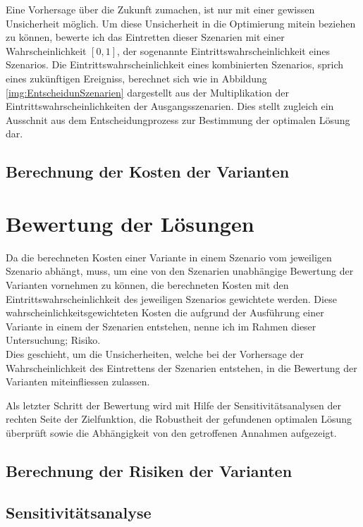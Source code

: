 Eine Vorhersage über die Zukunft zumachen, ist nur mit einer gewissen Unsicherheit möglich. Um diese Unsicherheit in die Optimierung mitein beziehen zu können, bewerte ich das Eintretten dieser Szenarien mit einer Wahrscheinlichkeit $[0,1]$, der sogenannte Eintrittswahrscheinlichkeit eines Szenarios.
Die Eintrittswahrscheinlichkeit eines kombinierten Szenarios, sprich eines zukünftigen Ereigniss, berechnet sich wie in Abbildung \ref{img:EntscheidunSzenarien} dargestellt aus der Multiplikation der Eintrittswahrscheinlichkeiten der Ausgangsszenarien.
Dies stellt zugleich ein Ausschnit aus dem Entscheidungprozess zur Bestimmung der optimalen Lösung dar.

\pagebreak

	


	\subsection{Berechnung der Kosten der Varianten}
	\label{subsec:Kostenberechnung}
	


\section{Bewertung der Lösungen}
\label{sec:Bewertung}

Da die berechneten Kosten einer Variante in einem Szenario vom jeweiligen Szenario abhängt, muss, um eine von den Szenarien unabhängige Bewertung der Varianten vornehmen zu können, die berechneten Kosten mit den Eintrittswahrscheinlichkeit des jeweiligen Szenarios gewichtete werden. Diese wahrscheinlichkeitsgewichteten Kosten die aufgrund der Ausführung einer Variante in einem der Szenarien entstehen, nenne ich im Rahmen dieser Untersuchung; Risiko. \\
Dies geschieht, um die Unsicherheiten, welche bei der Vorhersage der Wahrscheinlichkeit des Eintrettens der Szenarien entstehen, in die Bewertung der Varianten miteinfliessen zulassen. 

Als letzter Schritt der Bewertung wird mit Hilfe der Sensitivitätsanalysen der rechten Seite der Zielfunktion, die Robustheit der gefundenen optimalen Lösung überprüft sowie die Abhängigkeit von den getroffenen Annahmen aufgezeigt.


	\subsection{Berechnung der Risiken der Varianten}
	



	\subsection{Sensitivitätsanalyse}
	

%

